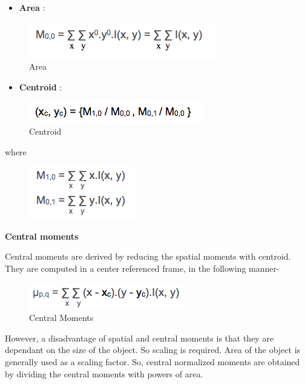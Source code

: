 \documentclass[]{article}
\providecommand{\tightlist}{%
  \setlength{\itemsep}{0pt}\setlength{\parskip}{0pt}}
\begin{document}
\begin{itemize}
\tightlist
\item
  \textbf{Area} :
\end{itemize}

\begin{figure}[htbp]
\centering
\includegraphics{images/Moments/Area.png}
\caption{Area}
\end{figure}
\pagebreak
\begin{itemize}
\tightlist
\item
  \textbf{Centroid} :
\end{itemize}

\begin{figure}[htbp]
\centering
\includegraphics{images/Moments/centroid.png}
\caption{Centroid}
\end{figure}

where

\begin{figure}[htbp]
\centering
\includegraphics{images/Moments/m10m01.png}
\caption{}
\end{figure}

\textbf{Central moments}

Central moments are derived by reducing the spatial moments with
centroid. They are computed in a center referenced frame, in the
following manner-

\begin{figure}[htbp]
\centering
\includegraphics{images/Moments/central moments.png}
\caption{Central Moments}
\end{figure}

However, a disadvantage of spatial and central moments is that they are
dependant on the size of the object. So scaling is required. Area of the
object is generally used as a scaling factor. So, central normalized
moments are obtained by dividing the central moments with powers of
area.
\end{document}
